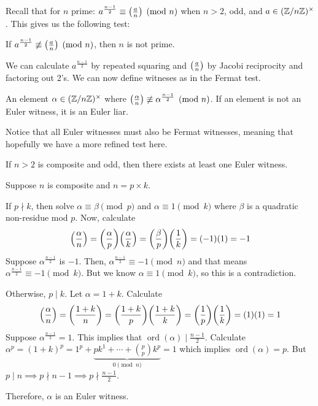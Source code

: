 \documentclass[notes]{agony}
\newcommand{\ord}{\operatorname{ord}}
\newcommand{\leg}[2]{\qty(\frac{#1}{#2})}
\newcommand{\mgrp}[1]{(\Z/#1\Z)^\times}
\begin{document}
Recall that for $n$ prime:
$a^{\frac{n-1}{2}} \equiv \leg{a}{n} \pmod n$ when $n > 2$, odd, and $a \in \mgrp{n}$.
This gives us the following test:

\begin{lemma}
  If $a^{\frac{n-1}{2}} \not\equiv \leg{a}{n} \pmod n$, then $n$ is not prime.
\end{lemma}

We can calculate $a^{\frac{n-1}{2}}$ by repeated squaring
and $\leg{a}{n}$ by Jacobi reciprocity and factoring out 2's.
We can now define witneses as in the Fermat test.

\begin{defn}
  An element $\alpha \in \mgrp{n}$ where
  $\leg{\alpha}{n} \not\equiv \alpha^{\frac{n-1}{2}} \pmod n$.
  If an element is not an Euler witness, it is an Euler liar.
\end{defn}

Notice that all Euler witnesses must also be Fermat witnesses,
meaning that hopefully we have a more refined test here.

\begin{theorem}
  If $n > 2$ is composite and odd, then there exists at least one Euler witness.
\end{theorem}
\begin{prf}
  Suppose $n$ is composite and $n = p \times k$.

  If $p \nmid k$, then solve $\alpha \equiv \beta \pmod p$ and $\alpha \equiv 1 \pmod k$
  where $\beta$ is a quadratic non-residue mod $p$.
  Now, calculate
  \[
    \leg{\alpha}{n} = \leg{\alpha}{p}\leg{\alpha}{k} = \leg{\beta}{p}\leg{1}{k} = (-1)(1) = -1
  \]
  Suppose $\alpha^{\frac{n-1}{2}}$ is $-1$.
  Then, $\alpha^{\frac{n-1}{2}} \equiv -1 \pmod n$
  and that means $\alpha^{\frac{n-1}{2}} \equiv -1 \pmod k$.
  But we know $\alpha \equiv 1 \pmod k$, so this is a contradiction.

  Otherwise, $p \mid k$.
  Let $\alpha = 1 + k$. Calculate
  \[
    \leg{\alpha}{n} = \leg{1+k}{n} = \leg{1+k}{p}\leg{1+k}{k} = \leg{1}{p}\leg{1}{k} = (1)(1) = 1
  \]
  Suppose $\alpha^{\frac{n-1}{2}} = 1$.
  This implies that $\ord(\alpha) \mid \frac{n-1}{2}$.
  Calculate $\alpha^p = (1+k)^p = 1^p + \underbrace{p k^1 + \dotsb + \binom{p}{p} k^p}_{0 \pmod n} = 1$
  which implies $\ord(\alpha) = p$.
  But $p \mid n \implies p \nmid n-1 \implies p \nmid \frac{n-1}{2}$.

  Therefore, $\alpha$ is an Euler witness.
\end{prf}
\end{document}

